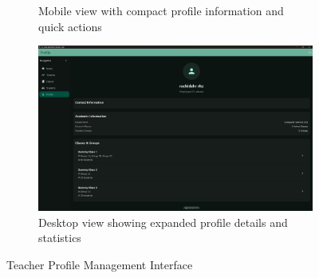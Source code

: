 \begin{figure}[H]
\begin{subfigure}[b]{0.35\textwidth}
        \caption{Mobile view with compact profile information and quick actions}
    \end{subfigure}
    \hfill
    \begin{subfigure}[b]{0.35\textwidth}
        \includegraphics[width=\textwidth]{images/rachid/teacher-side-profile-disktop.png}
        \caption{Desktop view showing expanded profile details and statistics}
    \end{subfigure}
    \caption{Teacher Profile Management Interface}
    \label{fig:profile-interface}
\end{figure}

